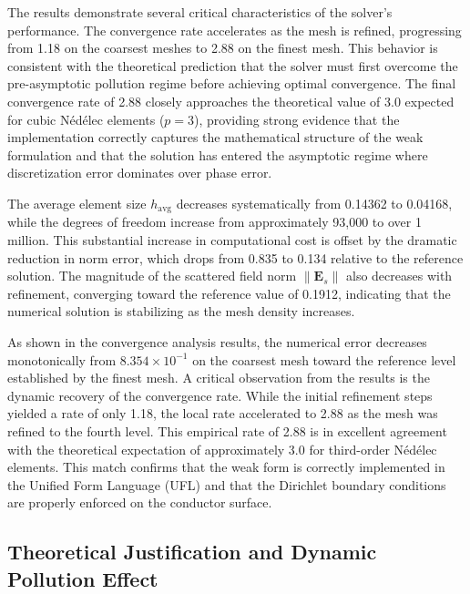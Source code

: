 \documentclass[class=report, crop=false]{standalone}
\begin{document}
The results demonstrate several critical characteristics of the solver's performance. The convergence rate accelerates as the mesh is refined, progressing from 1.18 on the coarsest meshes to 2.88 on the finest mesh. This behavior is consistent with the theoretical prediction that the solver must first overcome the pre-asymptotic pollution regime before achieving optimal convergence. The final convergence rate of 2.88 closely approaches the theoretical value of 3.0 expected for cubic Nédélec elements ($p=3$), providing strong evidence that the implementation correctly captures the mathematical structure of the weak formulation and that the solution has entered the asymptotic regime where discretization error dominates over phase error.

The average element size $h_{\text{avg}}$ decreases systematically from 0.14362 to 0.04168, while the degrees of freedom increase from approximately 93,000 to over 1 million. This substantial increase in computational cost is offset by the dramatic reduction in norm error, which drops from 0.835 to 0.134 relative to the reference solution. The magnitude of the scattered field norm $\|\bm{E}_s\|$ also decreases with refinement, converging toward the reference value of 0.1912, indicating that the numerical solution is stabilizing as the mesh density increases.

As shown in the convergence analysis results, the numerical error decreases monotonically from $8.354 \times 10^{-1}$ on the coarsest mesh toward the reference level established by the finest mesh. A critical observation from the results is the dynamic recovery of the convergence rate. While the initial refinement steps yielded a rate of only 1.18, the local rate accelerated to 2.88 as the mesh was refined to the fourth level. This empirical rate of 2.88 is in excellent agreement with the theoretical expectation of approximately 3.0 for third-order Nédélec elements. This match confirms that the weak form is correctly implemented in the Unified Form Language (UFL) and that the Dirichlet boundary conditions are properly enforced on the conductor surface.

\subsection{Theoretical Justification and Dynamic Pollution Effect}
\end{document}
